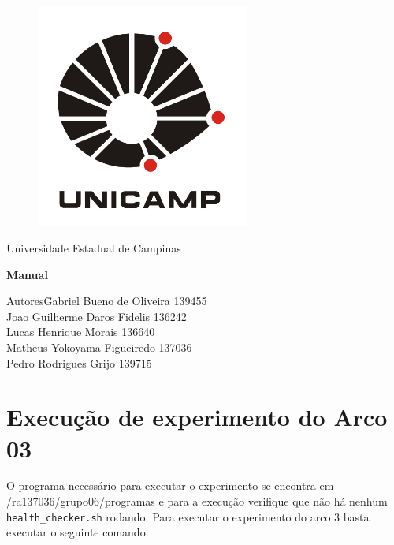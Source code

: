 \documentclass[a4paper,10pt]{article}
\date{\today}
\begin{document}
    \begin{titlepage}
        \begin{figure}
            \centering
          \includegraphics[width=7cm,keepaspectratio=true]{imagens/unicamp.png}

        \end{figure}
        \begin{center}
            \huge{Universidade Estadual de Campinas}

        \vfill
        \textbf{\LARGE{Manual}}
        \vfill
        \end{center}

        \begin{flushleft}
            \begin{tabbing}
                Autores\qquad\qquad\= Gabriel Bueno de Oliveira 139455 \\
                    \>Joao Guilherme Daros Fidelis 136242 \\
                    \>Lucas Henrique Morais 136640 \\
                    \>Matheus Yokoyama Figueiredo 137036\\
                    \>Pedro Rodrigues Grijo 139715\\
            \end{tabbing}
        \end{flushleft}
    \end{titlepage}

\newpage

\section{Execução de experimento do Arco 03}

        O programa necessário para executar o experimento se encontra em /ra137036/grupo06/programas e para a execução verifique que não há nenhum \verb|health_checker.sh| rodando. Para executar o experimento do arco 3 basta executar o seguinte comando:
    
\end{document}
